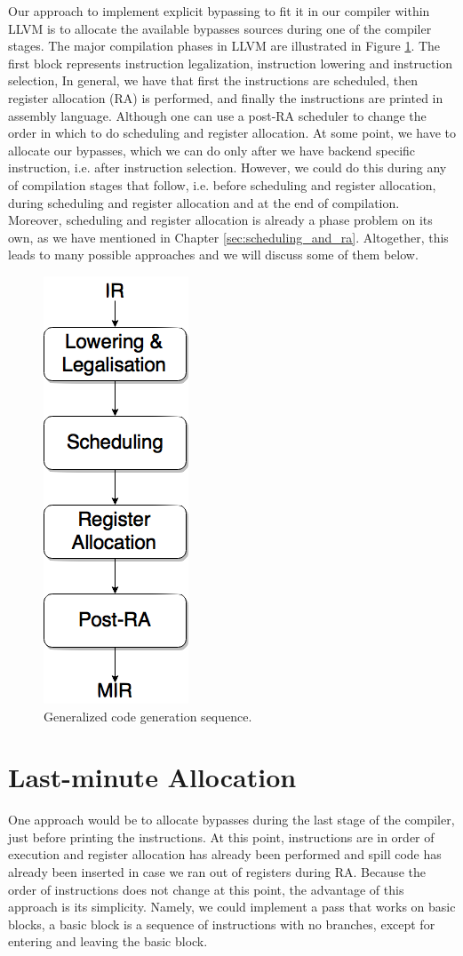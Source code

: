 Our approach to implement explicit bypassing to fit it in our compiler within LLVM is to allocate the available bypasses sources during one of the compiler stages. The major compilation phases in LLVM are illustrated in Figure \ref{fig:phase_ordering}.  The first block represents instruction legalization, instruction lowering and instruction selection, In general, we have that first the instructions are scheduled, then register allocation (RA) is performed, and finally the instructions are printed in assembly language. Although one can use a post-RA scheduler to change the order in which to do scheduling and register allocation. At some point, we have to allocate our bypasses, which we can do only after we have backend specific instruction, i.e. after instruction selection. However, we could do this during any of compilation stages that follow, i.e. before scheduling and register allocation, during scheduling and register allocation and at the end of compilation. Moreover, scheduling and register allocation is already a phase problem on its own, as we have mentioned in Chapter \ref{sec:scheduling_and_ra}. Altogether, this leads to many possible approaches and we will discuss some of them below.

\begin{figure}[H]
\centering
\includegraphics[width=.15\textwidth]{figures/phase_ordering}
\caption{Generalized code generation sequence.}
\label{fig:phase_ordering}
\end{figure}

\section{Last-minute Allocation}\label{sec:last_minute_alloc}
One approach would be to allocate bypasses during the last stage of the compiler, just before printing the instructions. At this point, instructions are in order of execution and register allocation has already been performed and spill code has already been inserted in case we ran out of registers during RA. Because the order of instructions does not change at this point, the advantage of this approach is its simplicity. Namely, we could implement a pass that works on basic blocks, a basic block is a sequence of instructions with no branches, except for entering and leaving the basic block.

